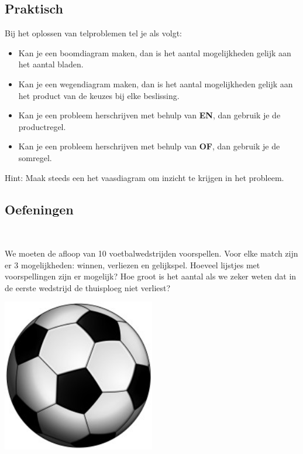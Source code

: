 \documentclass[12pt,a4paper,twoside]{article}
\begin{document}
\subsection{Praktisch}

\begin{mdframed}
Bij het oplossen van telproblemen tel je als volgt:
\begin{itemize}
  \item Kan je een boomdiagram maken, dan is het aantal mogelijkheden gelijk aan het aantal bladen.
  \item Kan je een wegendiagram maken, dan is het aantal mogelijkheden gelijk aan het product van de keuzes bij elke beslissing.
  \item Kan je een probleem herschrijven met behulp van {\bf EN}, dan gebruik je de productregel.
  \item Kan je een probleem herschrijven met behulp van {\bf OF}, dan gebruik je de somregel.
\end{itemize}
\end{mdframed}

Hint: Maak steeds een het vaasdiagram om inzicht te krijgen in het probleem.

\needspace{4cm}
\subsection{Oefeningen}

\begin{oefening}\\
\begin{minipage}[]{0.7\textwidth}
We moeten de afloop van 10 voetbalwedstrijden voorspellen. Voor elke match zijn er 3 mogelijkheden: winnen, verliezen en gelijkspel. Hoeveel lijstjes met voorspellingen zijn er mogelijk? Hoe groot is het aantal als we zeker weten dat in de eerste wedstrijd de thuisploeg niet verliest?
\end{minipage}
\begin{minipage}[]{0.29\textwidth}
  \centering
  \includegraphics[width=0.5\textwidth]{voetbal}
\end{minipage}
\end{oefening}
\end{document}
